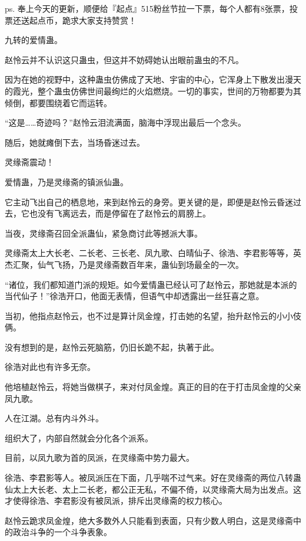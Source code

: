 
\begin{this_body}

ps. 奉上今天的更新，顺便给『起点』515粉丝节拉一下票，每个人都有8张票，投票还送起点币，跪求大家支持赞赏！

九转的爱情蛊。

赵怜云并不认识这只蛊虫，但这并不妨碍她认出眼前蛊虫的不凡。

因为在她的视野中，这种蛊虫仿佛成了天地、宇宙的中心，它浑身上下散发出漫天的霞光，整个蛊虫仿佛世间最绚烂的火焰燃烧。一切的事实，世间的万物都要为其倾倒，都要围绕着它而运转。

“这是……奇迹吗？”赵怜云泪流满面，脑海中浮现出最后一个念头。

随后，她就瘫倒下去，当场昏迷过去。

灵缘斋震动！

爱情蛊，乃是灵缘斋的镇派仙蛊。

它主动飞出自己的栖息地，来到赵怜云的身旁。更关键的是，即便是赵怜云昏迷过去，它也没有飞离远去，而是停留在了赵怜云的肩膀上。

当夜，灵缘斋召回全派蛊仙，紧急商讨此等撼派大事。

灵缘斋太上大长老、二长老、三长老、凤九歌、白晴仙子、徐浩、李君影等等，英杰汇聚，仙气飞扬，乃是灵缘斋数百年来，蛊仙到场最全的一次。

“诸位，我们都知道门派的规矩。如今爱情蛊已经认可了赵怜云，那她就是本派的当代仙子！”徐浩开口，他面无表情，但语气中却透露出一丝狂喜之意。

当初，他指点赵怜云，也不过是算计凤金煌，打击她的名望，抬升赵怜云的小小伎俩。

没有想到的是，赵怜云死脑筋，仍旧长跪不起，执著于此。

徐浩对此也有许多无奈。

他培植赵怜云，将她当做棋子，来对付凤金煌。真正的目的在于打击凤金煌的父亲凤九歌。

人在江湖。总有内斗外斗。

组织大了，内部自然就会分化各个派系。

目前，以凤九歌为首的凤派，在灵缘斋中势力最大。

徐浩、李君影等人。被凤派压在下面，几乎喘不过气来。好在灵缘斋的两位八转蛊仙太上大长老、太上二长老，都公正无私，不偏不倚，以灵缘斋大局为出发点。这才使得徐浩、李君影没有被凤派，排斥出灵缘斋的权力核心。

赵怜云跪求凤金煌，绝大多数外人只能看到表面，只有少数人明白，这是灵缘斋中的政治斗争的一个斗争表象。


\end{this_body}

